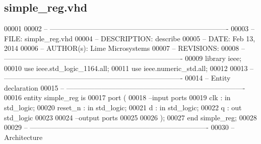 \subsection{simple\+\_\+reg.\+vhd}
\label{simple__reg_8vhd_source}

\begin{DoxyCode}
00001 
00002 \textcolor{keyword}{-- ---------------------------------------------------------------------------- }
00003 \textcolor{keyword}{-- FILE:    simple\_reg.vhd}
00004 \textcolor{keyword}{-- DESCRIPTION: describe}
00005 \textcolor{keyword}{-- DATE:    Feb 13, 2014}
00006 \textcolor{keyword}{-- AUTHOR(s):   Lime Microsystems}
00007 \textcolor{keyword}{-- REVISIONS:}
00008 \textcolor{keyword}{-- ---------------------------------------------------------------------------- }
00009 \textcolor{vhdlkeyword}{library }\textcolor{keywordflow}{ieee};
00010 \textcolor{vhdlkeyword}{use }ieee.std\_logic\_1164.\textcolor{keywordflow}{all};
00011 \textcolor{vhdlkeyword}{use }ieee.numeric\_std.\textcolor{keywordflow}{all};
00012 
00013 \textcolor{keyword}{-- ----------------------------------------------------------------------------}
00014 \textcolor{keyword}{-- Entity declaration}
00015 \textcolor{keyword}{-- ----------------------------------------------------------------------------}
00016 \textcolor{keywordflow}{entity }simple_reg \textcolor{keywordflow}{is}
00017   \textcolor{keywordflow}{port} \textcolor{vhdlchar}{(}
00018 \textcolor{keyword}{        --input ports }
00019             \textcolor{vhdlchar}{clk}      \textcolor{vhdlchar}{:} \textcolor{keywordflow}{in} \textcolor{comment}{std\_logic};
00020             \textcolor{vhdlchar}{reset_n}  \textcolor{vhdlchar}{:} \textcolor{keywordflow}{in} \textcolor{comment}{std\_logic};
00021             \textcolor{vhdlchar}{d}           \textcolor{vhdlchar}{:} \textcolor{keywordflow}{in} \textcolor{comment}{std\_logic};
00022             \textcolor{vhdlchar}{q}           \textcolor{vhdlchar}{:} \textcolor{keywordflow}{out} \textcolor{comment}{std\_logic}
00023 
00024 \textcolor{keyword}{        --output ports }
00025         
00026         \textcolor{vhdlchar}{)};
00027 \textcolor{keywordflow}{end} \textcolor{vhdlchar}{simple\_reg};
00028 
00029 \textcolor{keyword}{-- ----------------------------------------------------------------------------}
00030 \textcolor{keyword}{-- Architecture}

\end{DoxyCode}
